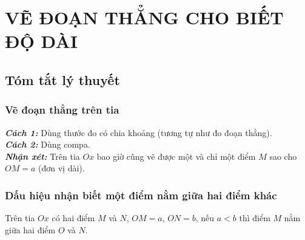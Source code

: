 \section{VẼ ĐOẠN THẲNG CHO BIẾT ĐỘ DÀI}
\subsection{Tóm tắt lý thuyết}
\subsubsection{Vẽ đoạn thẳng trên tia}
\textbf{\textit{Cách 1:}} Dùng thước đo có chia khoảng (tương tự như đo đoạn thẳng).\\
\textbf{\textit{Cách 2:}} Dùng compa.\\
\textbf{\textit{Nhận xét:}} Trên tia $Ox$ bao giờ cũng vẽ được một và chỉ một điểm $M$ sao cho $OM=a$ (đơn vị dài).
\subsubsection{Dấu hiệu nhận biết một điểm nằm giữa hai điểm khác}
Trên tia $Ox$ có hai điểm $M$ và $N$, $OM=a$, $ON=b$, nếu $a<b$ thì điểm $M$ nằm giữa hai điểm $O$ và $N$.
\begin{center}
\end{center}
